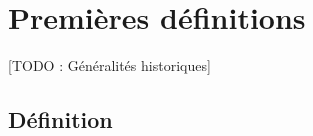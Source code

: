 
\chapter{Premières définitions}
	[TODO : Généralités historiques]
	\section{Définition}
	
	
\Tbreak